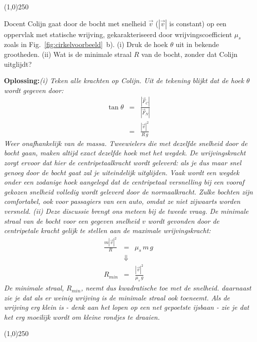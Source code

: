 \begin{center}
\line(1,0){250}
\end{center}
\begin{voorbeeld} 
Docent Colijn gaat door de bocht met snelheid $\vec{v}$ ($|\vec{v}|$ is constant) op een oppervlak met statische wrijving, 
gekarakteriseerd door wrijvingscoefficient $\mu_s$ zoals in Fig.~\ref{fig:cirkelvoorbeeld}~b). 
(i) Druk de hoek $\theta$ uit in bekende grootheden. (ii) Wat is de minimale straal $R$ van de bocht, zonder dat Colijn uitglijdt?  

{\bf Oplossing:}{\it (i) Teken alle krachten op Colijn. Uit de tekening blijkt dat de hoek $\theta$ wordt gegeven door:
\begin{eqnarray}
\tan\theta & = & \frac{|\vec{F}_C|}{|\vec{F}_N|} \\
& = & \frac{|\vec{v}|^2}{R\,g}
\end{eqnarray}
Weer onafhankelijk van de massa. Tweewielers die met dezelfde snelheid door de bocht gaan, maken altijd exact dezelfde
hoek met het wegdek. De wrijvingskracht zorgt ervoor dat hier de centripetaalkracht wordt geleverd: als je dus maar snel genoeg 
door de bocht gaat zal je uiteindelijk uitglijden. Vaak wordt een wegdek onder een zodanige hoek aangelegd dat 
de centripetaal versnelling bij een vooraf gekozen snelheid volledig wordt geleverd door de normaalkracht. Zulke bochten
zijn comfortabel, ook voor passagiers van een auto, omdat ze niet zijwaarts worden versneld. (ii) Deze discussie 
brengt ons meteen bij de tweede vraag. De minimale straal van de bocht voor een gegeven snelheid $v$ wordt gevonden 
door de centripetale kracht gelijk te stellen aan de maximale wrijvingskracht:
\begin{eqnarray}
\frac{m|\vec{v}|^2}{R} & = & \mu_s \,m\,g \\
& \Downarrow& \\
R_{min} & = & \frac{|\vec{v}|^2}{\mu_s \,g}
\end{eqnarray}
De minimale straal, $R_{min}$, neemt dus kwadratische toe met de snelheid. daarnaast zie je dat als er weinig 
wrijving is de minimale straal ook toeneemt. Als de wrijving erg klein is - denk aan het lopen op een net gepoetste 
ijsbaan - zie je dat het erg moeilijk wordt om kleine rondjes te draaien.
}
\end{voorbeeld}
\begin{center}
\line(1,0){250}
\end{center}


